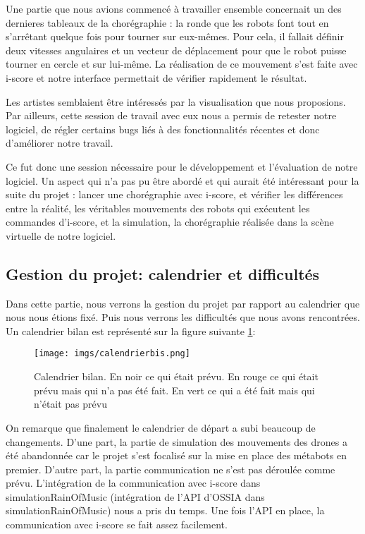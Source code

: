 Une partie que nous avions commencé à travailler ensemble concernait un des dernieres tableaux de la chorégraphie : la ronde que les robots font tout en s'arrêtant quelque fois pour tourner sur eux-mêmes. Pour cela, il fallait définir deux vitesses angulaires et un vecteur de déplacement pour que le robot puisse tourner en cercle et sur lui-même. La réalisation de ce mouvement s'est faite avec i-score et notre interface permettait de vérifier rapidement le résultat. 

Les artistes semblaient être intéressés par la visualisation que nous proposions. Par ailleurs, cette session de travail avec eux nous a permis de retester notre logiciel, de régler certains bugs liés à des fonctionnalités récentes et donc d'améliorer notre travail. 

Ce fut donc une session nécessaire pour le développement et l'évaluation de notre logiciel. Un aspect qui n'a pas pu être abordé et qui aurait été intéressant pour la suite du projet : lancer une chorégraphie avec i-score, et vérifier les différences entre la réalité, les véritables mouvements des robots qui exécutent les commandes d'i-score, et la simulation, la chorégraphie réalisée dans la scène virtuelle de notre logiciel.

\subsection{Gestion du projet: calendrier et difficultés}

Dans cette partie, nous verrons la gestion du projet par rapport au calendrier que nous nous étions fixé. Puis nous verrons les difficultés que nous avons rencontrées. Un calendrier bilan est représenté sur la figure suivante \ref{cal}:

\begin{figure}[H]
  \begin{center}
  	\texttt{[image: imgs/calendrierbis.png]}
  	\caption{Calendrier bilan. En noir ce qui était prévu. En rouge ce qui était prévu mais qui n'a pas été fait. En vert ce qui a été fait mais qui n'était pas prévu}
  	\label{cal}
  \end{center}
\end{figure}

On remarque que finalement le calendrier de départ a subi beaucoup de changements. D'une part, la partie de simulation des mouvements des drones a été abandonnée car le projet s'est focalisé sur la mise en place des métabots en premier. D'autre part, la partie communication ne s'est pas déroulée comme prévu. L'intégration de la communication avec i-score dans simulationRainOfMusic (intégration de l'API d'OSSIA dans simulationRainOfMusic) nous a pris du temps. Une fois l'API en place, la communication avec i-score se fait assez facilement. 

